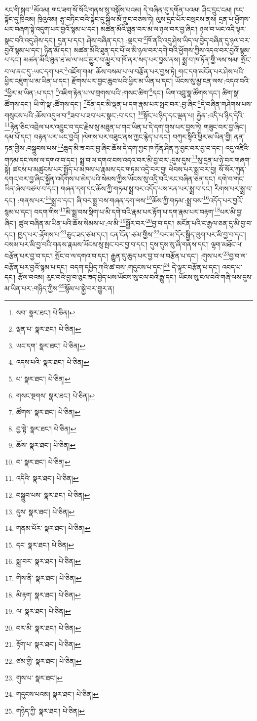 རང་གི་སྐབ་\footnote{སབ་  སྣར་ཐང་།  པེ་ཅིན། }མོའམ། གང་ཟག་སོ་སོའི་གནས་སུ་བསྐོས་པའམ། དེ་བཞིན་དུ་དགོན་པའམ། ཤིང་དྲུང་ངམ། ཁང་སྟོང་དུ་ཁྲིའམ། ཁྲིའུའམ། རྩྭ་བཏིང་བའི་སྟེང་དུ་སྐྱིལ་མོ་ཀྲུང་བཅས་ཏེ། ལུས་དྲང་པོར་བསྲངས་ནས། དྲན་པ་ཕྱོགས་པར་བཞག་སྟེ་འདུག་པར་བྱའོ་སྙམ་པ་དང་། མཚན་མོའི་ཐུན་བར་མ་ལ་ཉལ་བར་བྱ་ཞིང་། ཉལ་བ་ཡང་འདི་ལྟར་སྣང་བའི་འདུ་ཤེས་དང་། དྲན་པ་དང་། ཤེས་བཞིན་དང་། :ལྡང་བ་\footnote{ལྡན་པ་  སྣར་ཐང་།  པེ་ཅིན། }ཁོ་ནའི་འདུ་ཤེས་ཡིད་ལ་བྱེད་བཞིན་དུ་ཉལ་བར་བྱའོ་སྙམ་པ་དང་། ཉིན་མོ་དང་། མཚན་མོའི་ཐུན་དང་པོ་ལ་མི་ཉལ་བར་དགེ་བའི་ཕྱོགས་ཀྱིས་འདའ་བར་བྱའོ་སྙམ་པ་དང་། མཚན་མོའི་ཐུན་ཐ་མ་ལ་ཡང་མྱུར་བ་མྱུར་བ་ཁོ་ནར་སད་པར་བྱས་ནས། སྨྲ་བ་ཁ་ཏོན་གྱི་ལས་སམ། སྤོང་བ་ལ་ནང་དུ་:ཡང་དག་པར་\footnote{ཡང་དག་  སྣར་ཐང་།  པེ་ཅིན། }འཇོག་གམ། ཆོས་བསམ་པ་ལ་བརྩོན་པར་བྱས་ཏེ། གང་དག་མངོན་པར་ཤེས་པའི་ཕྱིར་འཇུག་པ་མ་ཡིན་པ་དང་། རྫོགས་པར་བྱང་ཆུབ་པའི་ཕྱིར་མ་ཡིན་པ་དང་། ཡོངས་སུ་མྱ་ངན་ལས་:འདའ་བའི་\footnote{འདས་པའི་  སྣར་ཐང་།  པེ་ཅིན། }ཕྱིར་མ་ཡིན་:པ་དང་། \footnote{པ་  སྣར་ཐང་།  པེ་ཅིན། }འཇིག་རྟེན་པ་ལ་གྲགས་པའི་:གསང་ཚིག་\footnote{གསང་སྔགས་  སྣར་ཐང་།  པེ་ཅིན། }དང་། ཡིག་འབྲུ་སྣ་ཚོགས་དང་། ཚིག་སྣ་ཚོགས་དང་། ཡི་གེ་སྣ་:ཚོགས་དང་། \footnote{ཚོགས་  སྣར་ཐང་།  པེ་ཅིན། }དོན་དང་མི་ལྡན་པ་དག་རྣམ་པར་སྤང་བར་:བྱ་ཞིང་\footnote{བྱ་སྟེ་  སྣར་ཐང་།  པེ་ཅིན། }དེ་བཞིན་གཤེགས་པས་གསུངས་པའི་:ཆོས་འདུལ་བ་\footnote{ཆོས་  སྣར་ཐང་།  པེ་ཅིན། }ཟབ་པ་ཟབ་པར་སྣང་:བ་དང་། \footnote{བ་  སྣར་ཐང་།  པེ་ཅིན། }སྟོང་པ་ཉིད་དང་ལྡན་པ། རྐྱེན་:འདི་པ་ཉིད་དེའི་\footnote{འདིའི་  སྣར་ཐང་།  པེ་ཅིན། }རྟེན་ཅིང་འབྲེལ་པར་འབྱུང་བ་དང་རྗེས་སུ་མཐུན་པ་གང་ཡིན་པ་དེ་དག་གུས་པར་བྱས་ཏེ། གཟུང་བར་བྱ་ཞིང་། དམ་པོ་དང་། བརྟན་པར་ཡང་བྱའོ། །ལེགས་པར་བཟུང་ནས་ཀྱང་རྙེད་པ་དང་། བཀུར་སྟིའི་ཕྱིར་མ་ཡིན་གྱི། ནན་ཏན་གྱིས་:བསྒྲུབས་པས་\footnote{བསྒྲུབ་པས་  སྣར་ཐང་།  པེ་ཅིན། }ཆུད་མི་ཟ་བར་བྱ་ཞིང་ཆོས་དེ་དག་ཀྱང་ཁ་ཏོན་ཤིན་ཏུ་བྱང་བར་བྱ་བ་དང་། འདུ་འཛིའི་གཏམ་དང་ལས་ལ་དགའ་བ་དང་། སྨྲ་བ་ལ་དགའ་བས་འདའ་བར་མི་བྱ་བར་:དུས་དུས་\footnote{དུས་  སྣར་ཐང་།  པེ་ཅིན། }སུ་དྲན་པ་ཉེ་བར་གཞག་སྟེ། ཚངས་པ་མཚུངས་པར་སྤྱོད་པ་མཁས་པ་རྣམས་དང་གཏམ་འདྲེ་བར་བྱ། ཕེབས་པར་སྨྲ་བར་བྱ། སོ་སོར་ཀུན་དགའ་བར་བྱ་ཞིང་སྐྱོན་འདོགས་པ་མེད་པའི་སེམས་ཀྱིས་ཡོངས་སུ་འདྲི་བའི་རང་བཞིན་ཅན་དང་། དགེ་བ་གང་ཡིན་ཞེས་བཙལ་བ་དང་། གཞན་དག་དང་ཆོས་ཀྱི་གཏམ་སྨྲ་བར་འདོད་པས་རན་པར་སྨྲ་བ་དང་། རིགས་པར་སྨྲ་བ་དང་། :གནས་པར་\footnote{གནམ་པོར་  སྣར་ཐང་།  པེ་ཅིན། }སྨྲ་བ་དང་། ཞི་བར་སྨྲ་བས་གཞན་དག་ལས་\footnote{དང་  སྣར་ཐང་།  པེ་ཅིན། }ཆོས་ཀྱི་གཏམ་:སྨྲ་བས་\footnote{སྨྲ་བར་  སྣར་ཐང་།  པེ་ཅིན། }འདོད་པར་བྱའོ་སྙམ་པ་དང་། བདག་གིས་\footnote{གིས་ནི་  སྣར་ཐང་།  པེ་ཅིན། }མི་སྨྲ་བས་སྡིག་པ་མི་དགེ་བའི་རྣམ་པར་རྟོག་པ་དག་རྣམ་པར་བརྟག་\footnote{མི་རྟག་  སྣར་ཐང་།  པེ་ཅིན། }པར་མི་བྱ་ཞིང་། ཚུལ་བཞིན་མ་ཡིན་པའི་ཆོས་སེམས་པ་:ལ་མི་\footnote{ལ་  སྣར་ཐང་།  པེ་ཅིན། }སྦྱོར་བར་\footnote{བར་མི་  སྣར་ཐང་།  པེ་ཅིན། }བྱ་བ་དང་། མངོན་པའི་ང་རྒྱལ་ཅན་དུ་མི་བྱ་བ་དང་། ཁྱད་པར་:རྟོགས་པ་\footnote{རྟོག་པ་  སྣར་ཐང་།  པེ་ཅིན། }ཅུང་ཟད་ཙམ་དང་། ངན་ངོན་:ཙམ་གྱིས་\footnote{ཙམ་གྱི་  སྣར་ཐང་།  པེ་ཅིན། }བར་མ་དོར་སྒྱིད་ལུག་པར་མི་བྱ་བ་དང་། བསམ་པར་མི་བྱ་བའི་གནས་རྣམས་ཡོངས་སུ་སྤང་བར་བྱ་བ་དང་། དུས་དུས་སུ་ཞི་གནས་དང་། ལྷག་མཐོང་ལ་བརྩོན་པར་བྱ་བ་དང་། སྤོང་བ་ལ་དགའ་བ་དང་། རྒྱུན་དུ་ཆུད་པར་བྱ་བ་ལ་བརྩོན་པ་དང་། :གུས་པར་\footnote{གུས་པ་  སྣར་ཐང་། }བྱ་བ་ལ་བརྩོན་པར་བྱའོ་སྙམ་པ་དང་། བདག་དཔྱིད་ཀའི་ཚ་བས་:གདུངས་པ་དང་།\footnote{གདུངས་པའམ།  སྣར་ཐང་།  པེ་ཅིན། } དེ་ལྟར་བརྩོན་པ་དང་། འབད་པ་དང་། རྩོལ་བའམ། རུང་བའི་བྱ་བ་ཅུང་ཟད་བྱེད་པས་ཡོངས་སུ་ངལ་བའི་རྒྱུ་དང་། ཡོངས་སུ་ངལ་བའི་གཞི་ལས་དུས་མ་ཡིན་པར་:གཉིད་ཀྱིས་\footnote{གཉིད་ཀྱི་  སྣར་ཐང་།  པེ་ཅིན། }སྙོམ་པ་སྐྱེ་བར་གྱུར་ན། 